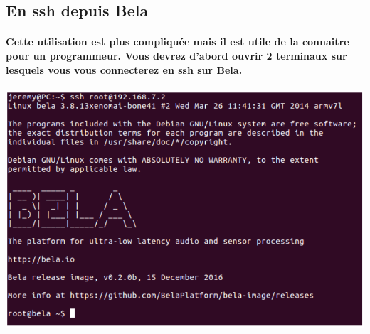 \documentclass[a4paper]{article}
\begin{document}
\subsection{En ssh depuis Bela} \paragraph{Cette utilisation est plus compliquée
mais il est utile de la connaitre pour un programmeur. Vous devrez d’abord
ouvrir 2 terminaux sur lesquels vous vous connecterez en ssh sur
Bela.\newline\newline}

\includegraphics[width=1\textwidth]{terminal3.png}
\end{document}
